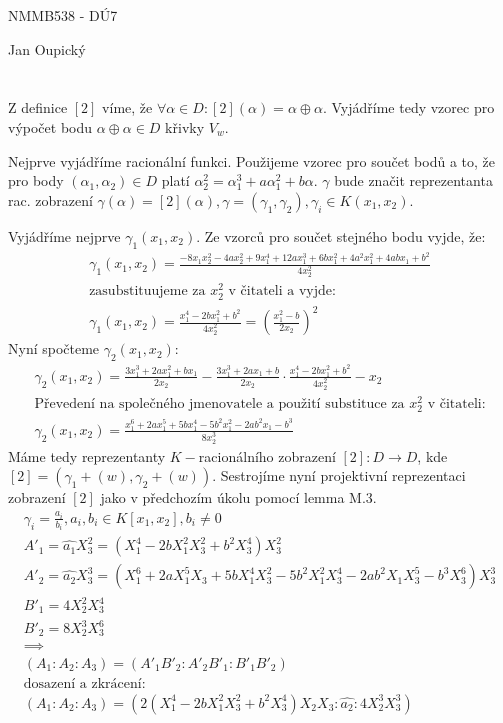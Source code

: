 \documentclass[12pt, a4paper]{article}
\begin{document}
\begin{center}
\large NMMB538 - DÚ7

\normalsize Jan Oupický
\end{center}
\vspace{1\baselineskip}

\section{}
Z definice $[2]$ víme, že $\forall \alpha \in D: [2](\alpha) = \alpha \oplus \alpha$. Vyjádříme tedy vzorec pro výpočet bodu $\alpha \oplus \alpha \in D$ křivky $V_w$.

Nejprve vyjádříme racionální funkci. Použijeme vzorec pro součet bodů a to, že pro body $(\alpha_1, \alpha_2) \in D$ platí $\alpha_2^2 = \alpha_1^3+a \alpha_1^2 + b \alpha$. $\gamma$ bude značit reprezentanta rac. zobrazení $\gamma(\alpha) = [2](\alpha), \gamma = (\gamma_1, \gamma_2), \gamma_i \in K(x_1, x_2)$. 

Vyjádříme nejprve $\gamma_1(x_1,x_2)$. Ze vzorců pro součet stejného bodu vyjde, že:
\begin{gather*}
\gamma_1(x_1,x_2) = \frac{-8x_1x_2^2 - 4ax_2^2 + 9x_1^4+12ax_1^3+6bx_1^2+4a^2x_1^2+4abx_1+b^2}{4x_2^2}\\
\text{zasubstituujeme za $x_2^2$ v čitateli a vyjde:}\\
\gamma_1(x_1,x_2) = \frac{x_1^4-2bx_1^2+b^2}{4x_2^2} = \left( \frac{x_1^2-b}{2x_2} \right)^2
\end{gather*}
Nyní spočteme $\gamma_2(x_1,x_2)$:
\begin{gather*}
\gamma_2(x_1,x_2) = \frac{3x_1^3+2ax_1^2+bx_1}{2x_2}-\frac{3x_1^3+2ax_1+b}{2x_2}\cdot \frac{x_1^4-2bx_1^2+b^2}{4x_2^2}-x_2\\
\text{Převedení na společného jmenovatele a použití substituce za $x_2^2$ v čitateli:}\\
\gamma_2(x_1,x_2) = \frac{x_1^6+2ax_1^5+5bx_1^4-5b^2x_1^2-2ab^2x_1-b^3}{8x_2^3}
\end{gather*}
Máme tedy reprezentanty $K-$racionálního zobrazení $[2]: D \rightarrow D$, kde \\$[2] = (\gamma_1+(w), \gamma_2+(w))$. Sestrojíme nyní projektivní reprezentaci zobrazení $[2]$ jako v předchozím úkolu pomocí lemma M.3.
\begin{gather*}
\gamma_i = \frac{a_i}{b_i}, a_i, b_i \in K[x_1,x_2], b_i \neq 0\\
A'_1 = \widehat{a_1} X_3^2 = (X_1^4-2bX_1^2X_3^2 + b^2X_3^4)X_3^2\\
A'_2 = \widehat{a_2} X_3^3 = (X_1^6+2aX_1^5X_3+5bX_1^4X_3^2-5b^2X_1^2X_3^4-2ab^2X_1X_3^5-b^3X_3^6) X_3^3\\
B'_1 = 4X_2^2X_3^4\\
B'_2 = 8X_2^3X_3^6\\
\implies\\
(A_1 : A_2 : A_3) = (A'_1B'_2 : A'_2B'_1 : B'_1B'_2)\\
\text{dosazení a zkrácení:}\\
(A_1 : A_2 : A_3) = (2(X_1^4-2bX_1^2X_3^2 + b^2X_3^4)X_2X_3 : \widehat{a_2} : 4X_2^3X_3^3)
\end{gather*}
\end{document}
